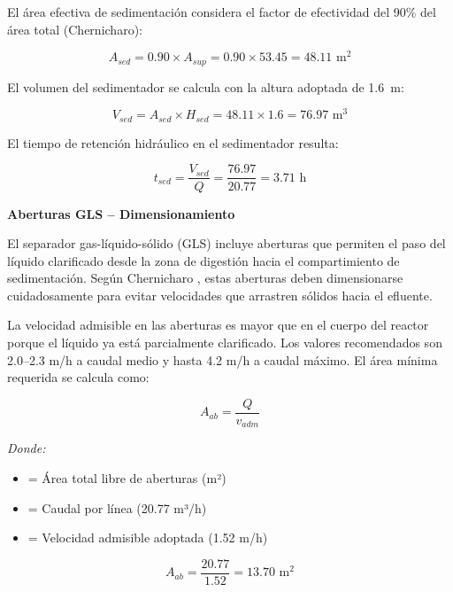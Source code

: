 \documentclass[12pt,a4paper]{article}
\begin{document}
El área efectiva de sedimentación considera el factor de efectividad del 90\% del área total (Chernicharo):

\begin{equation}
A_{sed} = 0.90 \times A_{sup} = 0.90 \times 53.45 = 48.11 \text{ m}^2
\end{equation}

El volumen del sedimentador se calcula con la altura adoptada de 1.6~m:

\begin{equation}
V_{sed} = A_{sed} \times H_{sed} = 48.11 \times 1.6 = 76.97 \text{ m}^3
\end{equation}

El tiempo de retención hidráulico en el sedimentador resulta:

\begin{equation}
t_{sed} = \frac{V_{sed}}{Q} = \frac{76.97}{20.77} = 3.71 \text{ h}
\end{equation}

\textbf{Aberturas GLS -- Dimensionamiento}

El separador gas-líquido-sólido (GLS) incluye aberturas que permiten el paso del líquido clarificado desde la zona de digestión hacia el compartimiento de sedimentación. Según Chernicharo \cite{chernicharo2007}, estas aberturas deben dimensionarse cuidadosamente para evitar velocidades que arrastren sólidos hacia el efluente.

La velocidad admisible en las aberturas es mayor que en el cuerpo del reactor porque el líquido ya está parcialmente clarificado. Los valores recomendados son 2.0--2.3 m/h a caudal medio y hasta 4.2 m/h a caudal máximo. El área mínima requerida se calcula como:

\begin{equation}
A_{ab} = \frac{Q}{v_{adm}}
\end{equation}

\textit{Donde:}
\begin{itemize}[noitemsep,leftmargin=2em]
    \item[$A_{ab}$] = Área total libre de aberturas (m²)
    \item[$Q$] = Caudal por línea (20.77 m³/h)
    \item[$v_{adm}$] = Velocidad admisible adoptada (1.52 m/h)
\end{itemize}

\begin{equation}
A_{ab} = \frac{20.77}{1.52} = 13.70 \text{ m}^2
\end{equation}
\end{document}
